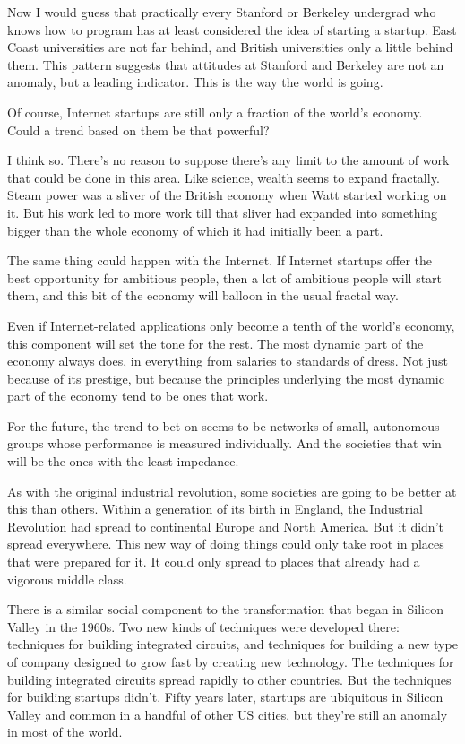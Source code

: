 Now I would guess that practically every Stanford or Berkeley undergrad
who knows how to program has at least considered the idea of starting a
startup. East Coast universities are not far behind, and British
universities only a little behind them. This pattern suggests that
attitudes at Stanford and Berkeley are not an anomaly, but a leading
indicator. This is the way the world is going.

Of course, Internet startups are still only a fraction of the world's
economy. Could a trend based on them be that powerful?

I think so. There's no reason to suppose there's any limit to the amount
of work that could be done in this area. Like science, wealth seems to
expand fractally. Steam power was a sliver of the British economy when
Watt started working on it. But his work led to more work till that
sliver had expanded into something bigger than the whole economy of
which it had initially been a part.

The same thing could happen with the Internet. If Internet startups
offer the best opportunity for ambitious people, then a lot of ambitious
people will start them, and this bit of the economy will balloon in the
usual fractal way.

Even if Internet-related applications only become a tenth of the world's
economy, this component will set the tone for the rest. The most dynamic
part of the economy always does, in everything from salaries to
standards of dress. Not just because of its prestige, but because the
principles underlying the most dynamic part of the economy tend to be
ones that work.

For the future, the trend to bet on seems to be networks of small,
autonomous groups whose performance is measured individually. And the
societies that win will be the ones with the least impedance.

As with the original industrial revolution, some societies are going to
be better at this than others. Within a generation of its birth in
England, the Industrial Revolution had spread to continental Europe and
North America. But it didn't spread everywhere. This new way of doing
things could only take root in places that were prepared for it. It
could only spread to places that already had a vigorous middle class.

There is a similar social component to the transformation that began in
Silicon Valley in the 1960s. Two new kinds of techniques were developed
there: techniques for building integrated circuits, and techniques for
building a new type of company designed to grow fast by creating new
technology. The techniques for building integrated circuits spread
rapidly to other countries. But the techniques for building startups
didn't. Fifty years later, startups are ubiquitous in Silicon Valley and
common in a handful of other US cities, but they're still an anomaly in
most of the world.


